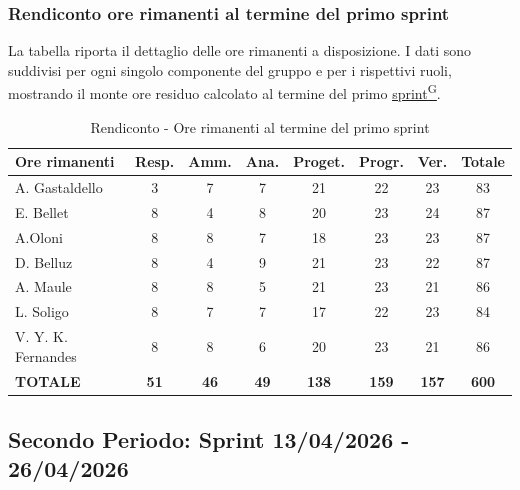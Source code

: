 \documentclass[a4paper,12pt]{article}
\providecommand{\glslink}[2]{\href{https://alittlebyte-19.github.io/Documentazione/glossario.html\#gls-#1}{\underline{#2}\textsuperscript{\scriptsize G}}}
\begin{document}
\subsubsection{Rendiconto ore rimanenti al termine del primo sprint}
La tabella riporta il dettaglio delle ore rimanenti a disposizione. I dati sono suddivisi per ogni singolo componente del gruppo e per i rispettivi ruoli, mostrando il monte ore residuo calcolato al termine del primo \glslink{sprint}{sprint}.

\begin{table}[htbp]
\centering
\renewcommand{\arraystretch}{1.5} 
\begin{tabularx}{\textwidth}{|X|c|c|c|c|c|c|c|}
\hline
\textbf{Ore rimanenti} & \textbf{Resp.} & \textbf{Amm.} & \textbf{Ana.} & \textbf{Proget.} & \textbf{Progr.} & \textbf{Ver.} & \textbf{Totale} \\
\hline
A. Gastaldello & 3 & 7 & 7 & 21 & 22 & 23 & 83 \\
\hline
E. Bellet & 8 & 4 & 8 & 20 & 23 & 24 & 87 \\
\hline
A.Oloni & 8 & 8 & 7 & 18 & 23 & 23 & 87 \\
\hline
D. Belluz & 8 & 4 & 9 & 21 & 23 & 22 & 87 \\
\hline
A. Maule & 8 & 8 & 5 & 21 & 23 & 21 & 86 \\
\hline
L. Soligo & 8 & 7 & 7 & 17 & 22 & 23 & 84 \\
\hline
V. Y. K. Fernandes & 8 & 8 & 6 & 20 & 23 & 21 & 86 \\
\hline
\rowcolor{gray!20}
\textbf{TOTALE} & \textbf{51} & \textbf{46} & \textbf{49} & \textbf{138} & \textbf{159} & \textbf{157} & \textbf{600} \\
\hline
\end{tabularx}
\caption{Rendiconto - Ore rimanenti al termine del primo sprint}
\end{table}

\newpage
\subsection{Secondo Periodo: Sprint 13/04/2026 - 26/04/2026}
\label{sec:pec_secondoperiodo}

\vspace{0.5em}
\end{document}
